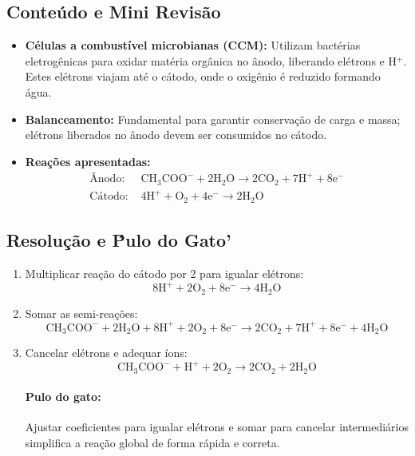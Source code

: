 \documentclass{article}
\begin{document}
\subsection*{Conteúdo e Mini Revisão}
\begin{itemize}
\item \textbf{Células a combustível microbianas (CCM):} Utilizam bactérias eletrogênicas para oxidar matéria orgânica no ânodo, liberando elétrons e H$^+$. Estes elétrons viajam até o cátodo, onde o oxigênio é reduzido formando água.

\item \textbf{Balanceamento:} Fundamental para garantir conservação de carga e massa; elétrons liberados no ânodo devem ser consumidos no cátodo.

\item \textbf{Reações apresentadas:}
\[
\begin{aligned}
\text{Ânodo: } & \mathrm{CH_3COO^- + 2 H_2O \rightarrow 2 CO_2 + 7 H^+ + 8 e^-} \\
\text{Cátodo: } & \mathrm{4 H^+ + O_2 + 4 e^- \rightarrow 2 H_2O}
\end{aligned}
\]

\end{itemize}

\subsection*{Resolução e \'Pulo do Gato'}
\begin{enumerate}
\item Multiplicar reação do cátodo por 2 para igualar elétrons:
\[
\mathrm{8 H^+ + 2 O_2 + 8 e^- \rightarrow 4 H_2O}
\]
\item Somar as semi-reações:
\[
\mathrm{CH_3COO^- + 2 H_2O + 8 H^+ + 2 O_2 + 8 e^- \rightarrow 2 CO_2 + 7 H^+ + 8 e^- + 4 H_2O}
\]
\item Cancelar elétrons e adequar íons:
\[
\mathrm{CH_3COO^- + H^+ + 2 O_2 \rightarrow 2 CO_2 + 2 H_2O}
\]

\paragraph{Pulo do gato:} Ajustar coeficientes para igualar elétrons e somar para cancelar intermediários simplifica a reação global de forma rápida e correta.
\end{enumerate}
\end{document}
